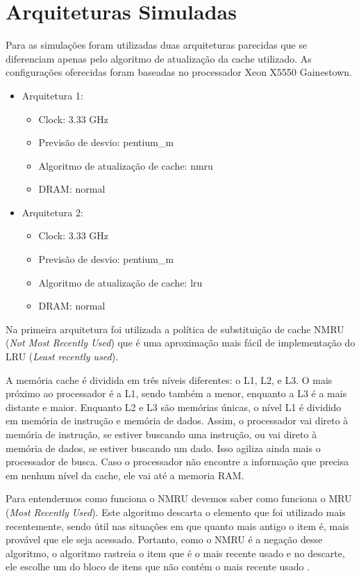 \documentclass[12pt]{article}
\begin{document}
\section{Arquiteturas Simuladas} \label{sec:arqsi}
Para as simulações foram utilizadas duas arquiteturas parecidas que se diferenciam apenas pelo algoritmo de atualização da cache utilizado. As configurações oferecidas foram baseadas no processador Xeon X5550 Gainestown.
\begin{itemize}
    \item Arquitetura 1:
    \begin{itemize}
        \item Clock: 3.33 GHz
        \item Previsão de desvio: pentium\_m
        \item Algoritmo de atualização de cache: nmru
        \item DRAM: normal
    \end{itemize}
    
    \item Arquitetura 2:
    \begin{itemize}
        \item Clock: 3.33 GHz
        \item Previsão de desvio: pentium\_m
        \item Algoritmo de atualização de cache: lru
        \item DRAM: normal
    \end{itemize}
\end{itemize}


Na primeira arquitetura foi utilizada a política de substituição de cache NMRU (\textit{Not Most Recently Used}) que é uma aproximação mais fácil de implementação do LRU (\textit{Least recently used}). 

A memória cache é dividida em três níveis diferentes: o L1, L2, e L3. O mais próximo ao processador é a L1, sendo também a menor, enquanto a L3 é a mais distante e maior. Enquanto L2 e L3 são memórias únicas, o nível L1 é dividido em memória de instrução e memória de dados. Assim, o processador vai direto à memória de instrução, se estiver buscando uma instrução, ou vai direto à memória de dados, se estiver buscando um dado. Isso agiliza ainda mais o processador de busca. Caso o processador não encontre a informação que precisa em nenhum nível da cache, ele vai até a memoria RAM.

Para entendermos como funciona o NMRU devemos saber como funciona o MRU (\textit{Most Recently Used}). Este algoritmo descarta o elemento que foi utilizado mais recentemente, sendo útil nas situações em que quanto mais antigo o item é, mais provável que ele seja acessado.\cite{mru} Portanto, como o NMRU é a negação desse algoritmo, o algoritmo rastreia o item que é o mais recente usado e no descarte, ele escolhe um do bloco de itens que não contém o mais recente usado \cite{nmru}.
\end{document}
